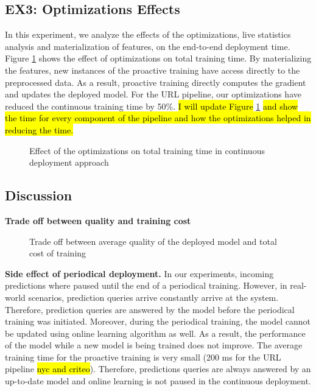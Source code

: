\subsection{EX3: Optimizations Effects}
In this experiment, we analyze the effects of the optimizations, live statistics analysis and materialization of features, on the end-to-end deployment time.
Figure \ref{optimization-effect} shows the effect of optimizations on total training time.
By materializing the features, new instances of the proactive training have access directly to the preprocessed data.
As a result, proactive training directly computes the gradient and updates the deployed model.
For the URL pipeline, our optimizations have reduced the continuous training time by 50\%.
\hl{I will update Figure} \ref{optimization-effect} \hl{and show the time for every component of the pipeline and how the optimizations helped in reducing the time.}
\begin{figure}[h!]
\centering
\resizebox{\columnwidth}{!}{}
\caption{Effect of the optimizations on total training time in continuous deployment approach}
\label{optimization-effect}
\end{figure}

\subsection{Discussion} \label{subsec:discussion}
\textbf{Trade off between quality and training cost}
\begin{figure}[!h]
\centering
\resizebox{\columnwidth}{!}{}
\caption{Trade off between average quality of the deployed model and total cost of training}
\label{sampling-method-figure}
\end{figure}
\textbf{Side effect of periodical deployment.}
In our experiments, incoming predictions where paused until the end of a periodical training.
However, in real-world scenarios, prediction queries arrive constantly arrive at the system.
Therefore, prediction queries are answered by the model before the periodical training was initiated. 
Moreover, during the periodical training, the model cannot be updated using online learning algorithm as well.
As a result, the performance of the model while a new model is being trained does not improve.
The average training time for the proactive training is very small (200 ms for the URL pipeline \hl{nyc and criteo}).
Therefore, predictions queries are always answered by an up-to-date model and online learning is not paused in the continuous deployment.


